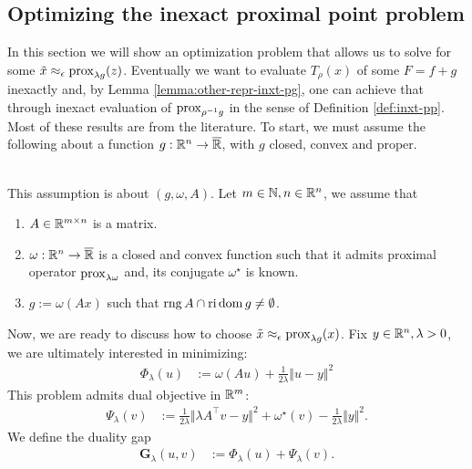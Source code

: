 \documentclass[12pt]{article}
\DeclareMathOperator{\rng}{\mathop{rng}}
\begin{document}
    \subsection{Optimizing the inexact proximal point problem}
        In this section we will show an optimization problem that allows us to solve for some $\tilde x \approx_\epsilon \operatorname{prox}_{\lambda g}(z)$. 
        Eventually we want to evaluate $T_{\rho}(x)$ of some $F = f + g$ inexactly and, by Lemma \ref{lemma:other-repr-inxt-pg}, one can achieve that through inexact evaluation of $\operatorname{prox}_{\rho^{-1}g}$ in the sense of Definition \ref{def:inxt-pp}. 
        Most of these results are from the literature. 
        To start, we must assume the following about a function $g: \mathbb R^n \rightarrow \overline {\mathbb R}$, with $g$ closed, convex and proper. 
        \begin{assumption}\;\label{ass:for-inxt-prox}\\
            This assumption is about $(g, \omega, A)$. 
            Let $m \in \mathbb N, n \in \mathbb R^n$, we assume that 
            \begin{enumerate}[nosep]
                \item $A\in \mathbb R^{m \times n}$ is a matrix. 
                \item $\omega: \mathbb R^n \rightarrow \overline {\mathbb R}$ is a closed and convex function such that it admits proximal operator $\operatorname{prox}_{\lambda\omega}$ and, its conjugate $\omega^\star$ is known. 
                \item $g := \omega(Ax)$ such that $\rng A \cap \reli\dom g \neq\emptyset$. 
            \end{enumerate}
        \end{assumption}
        Now, we are ready to discuss how to choose $\tilde x \approx_\epsilon \operatorname{prox}_{\lambda g}(x)$. 
        Fix $y \in \mathbb R^n, \lambda > 0$, we are ultimately interested in minimizing: 
        \begin{align}\label{eqn:primal-pp}
            \Phi_\lambda(u) &:= \omega(Au) + \frac{1}{2\lambda} \Vert u - y\Vert^2
        \end{align}
        This problem admits dual objective in $\mathbb R^m$: 
        \begin{align}\label{eqn:dual-pp}
            \Psi_\lambda(v) &:=
            \frac{1}{2\lambda}\Vert \lambda A^\top v - y\Vert^2
            + \omega^\star(v) - \frac{1}{2\lambda}\Vert y\Vert^2. 
        \end{align}
        We define the duality gap
        \begin{align}
            \mathbf G_\lambda(u, v) &:= \Phi_\lambda(u) + \Psi_\lambda(v). 
        \end{align}
\end{document}
